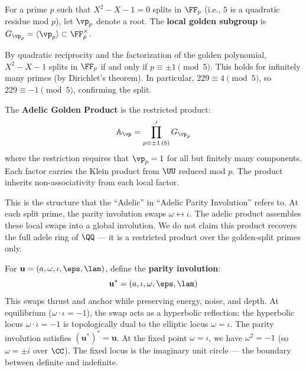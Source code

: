 \begin{definition}\label{def:local-golden}
For a prime $p$ such that $X^2 - X - 1 = 0$ splits in $\FF_p$ (i.e., $5$ is a quadratic residue mod $p$), let $\vp_p$ denote a root. The \textbf{local golden subgroup} is $G_{\vp_p} = \langle \vp_p \rangle \subset \FF_p^\times$.
\end{definition}

\begin{remark}
By quadratic reciprocity and the factorization of the golden polynomial, $X^2 - X - 1$ splits in $\FF_p$ if and only if $p \equiv \pm 1 \pmod{5}$. This holds for infinitely many primes (by Dirichlet's theorem). In particular, $229 \equiv 4 \pmod{5}$, so $229 \equiv -1 \pmod{5}$, confirming the split.
\end{remark}

\begin{definition}\label{def:adelic-product}
The \textbf{Adelic Golden Product} is the restricted product:
$$\mathbb{A}_{\vp} = \prod_{p \equiv \pm 1 \,(5)}' G_{\vp_p}$$
where the restriction requires that $\vp_p = 1$ for all but finitely many components. Each factor carries the Klein product from $\UU$ reduced mod $p$. The product inherits non-associativity from each local factor.
\end{definition}

This is the structure that the ``Adelic'' in ``Adelic Parity Involution'' refers to. At each split prime, the parity involution swaps $\omega \leftrightarrow \iota$. The adelic product assembles these local swaps into a global involution. We do not claim this product recovers the full adele ring of $\QQ$ --- it is a restricted product over the golden-split primes only.

\begin{definition}\label{def:monster}
For $\mathbf{u} = (a, \omega, \iota, \eps, \lam)$, define the \textbf{parity involution}:
$$\mathbf{u}^* = (a, \iota, \omega, \eps, \lam)$$
This swaps thrust and anchor while preserving energy, noise, and depth. At equilibrium ($\omega \cdot \iota = -1$), the swap acts as a hyperbolic reflection: the hyperbolic locus $\omega \cdot \iota = -1$ is topologically dual to the elliptic locus $\omega = \iota$. The parity involution satisfies $(\mathbf{u}^*)^* = \mathbf{u}$. At the fixed point $\omega = \iota$, we have $\omega^2 = -1$ (so $\omega = \pm i$ over $\CC$). The fixed locus is the imaginary unit circle --- the boundary between definite and indefinite.
\end{definition}

